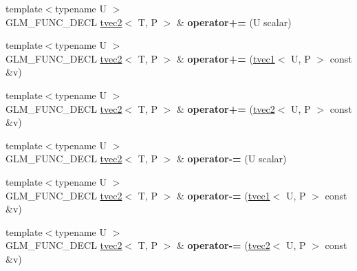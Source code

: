 \begin{DoxyCompactItemize}
\item 
\hypertarget{structglm_1_1tvec2_ab4a77220c5c80ac512efab4303ed0a6d}{{\footnotesize template$<$typename U $>$ }\\G\-L\-M\-\_\-\-F\-U\-N\-C\-\_\-\-D\-E\-C\-L \hyperlink{structglm_1_1tvec2}{tvec2}$<$ T, P $>$ \& {\bfseries operator+=} (U scalar)}\label{structglm_1_1tvec2_ab4a77220c5c80ac512efab4303ed0a6d}

\item 
\hypertarget{structglm_1_1tvec2_a260a29a9ba826d24f418f01ebd274d39}{{\footnotesize template$<$typename U $>$ }\\G\-L\-M\-\_\-\-F\-U\-N\-C\-\_\-\-D\-E\-C\-L \hyperlink{structglm_1_1tvec2}{tvec2}$<$ T, P $>$ \& {\bfseries operator+=} (\hyperlink{structglm_1_1tvec1}{tvec1}$<$ U, P $>$ const \&v)}\label{structglm_1_1tvec2_a260a29a9ba826d24f418f01ebd274d39}

\item 
\hypertarget{structglm_1_1tvec2_a8b512889a3d9ef4536135b1806cb19c4}{{\footnotesize template$<$typename U $>$ }\\G\-L\-M\-\_\-\-F\-U\-N\-C\-\_\-\-D\-E\-C\-L \hyperlink{structglm_1_1tvec2}{tvec2}$<$ T, P $>$ \& {\bfseries operator+=} (\hyperlink{structglm_1_1tvec2}{tvec2}$<$ U, P $>$ const \&v)}\label{structglm_1_1tvec2_a8b512889a3d9ef4536135b1806cb19c4}

\item 
\hypertarget{structglm_1_1tvec2_acc941bd8f14e3b52ce45433ae0ab8898}{{\footnotesize template$<$typename U $>$ }\\G\-L\-M\-\_\-\-F\-U\-N\-C\-\_\-\-D\-E\-C\-L \hyperlink{structglm_1_1tvec2}{tvec2}$<$ T, P $>$ \& {\bfseries operator-\/=} (U scalar)}\label{structglm_1_1tvec2_acc941bd8f14e3b52ce45433ae0ab8898}

\item 
\hypertarget{structglm_1_1tvec2_ac78b83ac2b1331f1d99f1fa9465c4147}{{\footnotesize template$<$typename U $>$ }\\G\-L\-M\-\_\-\-F\-U\-N\-C\-\_\-\-D\-E\-C\-L \hyperlink{structglm_1_1tvec2}{tvec2}$<$ T, P $>$ \& {\bfseries operator-\/=} (\hyperlink{structglm_1_1tvec1}{tvec1}$<$ U, P $>$ const \&v)}\label{structglm_1_1tvec2_ac78b83ac2b1331f1d99f1fa9465c4147}

\item 
\hypertarget{structglm_1_1tvec2_a6ad11c3283bc3a6d76f92047e15d3fcc}{{\footnotesize template$<$typename U $>$ }\\G\-L\-M\-\_\-\-F\-U\-N\-C\-\_\-\-D\-E\-C\-L \hyperlink{structglm_1_1tvec2}{tvec2}$<$ T, P $>$ \& {\bfseries operator-\/=} (\hyperlink{structglm_1_1tvec2}{tvec2}$<$ U, P $>$ const \&v)}\label{structglm_1_1tvec2_a6ad11c3283bc3a6d76f92047e15d3fcc}


\end{DoxyCompactItemize}
